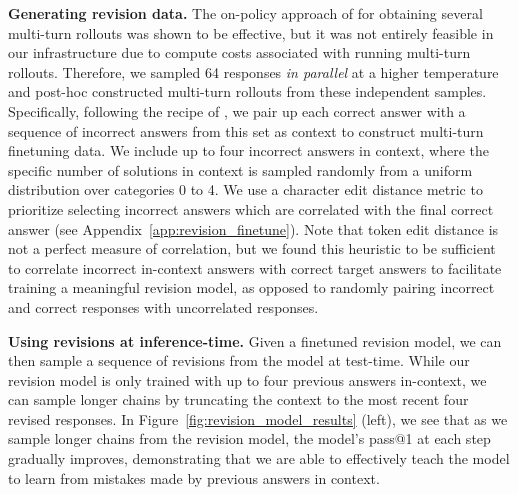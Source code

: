 \textbf{Generating revision data.} The on-policy approach of \citet{qu2024recursive} for obtaining several multi-turn rollouts was shown to be effective, but it was not entirely feasible in our infrastructure due to compute costs associated with running multi-turn rollouts. Therefore, we sampled 64 responses \emph{in parallel} at a higher temperature and post-hoc constructed multi-turn rollouts from these independent samples. Specifically, following the recipe of \citep{anonymousrevisions}, we pair up each correct answer  with a sequence of incorrect answers from this set as context to construct multi-turn finetuning data.
We include up to four incorrect answers in context, where the specific number of solutions in context is sampled randomly from a uniform distribution over categories 0 to 4. We use a character edit distance metric to prioritize selecting incorrect answers which are correlated with the final correct answer (see Appendix~\ref{app:revision_finetune}). Note that token edit distance is not a perfect measure of correlation, but we found this heuristic to be sufficient to correlate incorrect in-context answers with correct target answers to facilitate training a meaningful revision model, as opposed to randomly pairing incorrect and correct responses with uncorrelated responses.

\textbf{Using revisions at inference-time.} Given a finetuned revision model, we can then sample a sequence of revisions from the model at test-time. While our revision model is only trained with up to four previous answers in-context, we can sample longer chains by truncating the context to the most recent four revised responses. In Figure~\ref{fig:revision_model_results} (left), we see that as we sample longer chains from the revision model, the model's pass@1 at each step gradually improves, demonstrating that we are able to effectively teach the model to learn from mistakes made by previous answers in context.

